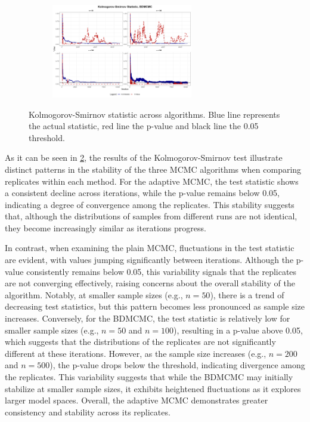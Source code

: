 \documentclass{report}
\begin{document}
\begin{figure}[!ht]
{\begin{minipage}{\textwidth}
			\vspace{0.4cm}   %
			
			\begin{subfigure}[b]{0.45\textwidth}   
				\centering
				\includegraphics[height=4.1cm]{Figures/Diagnostic/KS_BD.png}
				\label{fig:ks-bd}
			\end{subfigure}
		\end{minipage}
	}
	\caption{Kolmogorov-Smirnov statistic across algorithms. Blue line represents the actual statistic, red line the p-value and black line the 0.05 threshold.}
	\label{fig:ks-together}
\end{figure}

As it can be seen in \ref{fig:ks-together}, the results of the Kolmogorov-Smirnov test illustrate distinct patterns in the stability of the three MCMC algorithms when comparing replicates within each method. For the adaptive MCMC, the test statistic shows a consistent decline across iterations, while the p-value remains below 0.05, indicating a degree of convergence among the replicates. This stability suggests that, although the distributions of samples from different runs are not identical, they become increasingly similar as iterations progress. 

In contrast, when examining the plain MCMC, fluctuations in the test statistic are evident, with values jumping significantly between iterations. Although the p-value consistently remains below 0.05, this variability signals that the replicates are not converging effectively, raising concerns about the overall stability of the algorithm. Notably, at smaller sample sizes (e.g., $n=50$), there is a trend of decreasing test statistics, but this pattern becomes less pronounced as sample size increases. 
Conversely, for the BDMCMC, the test statistic is relatively low for smaller sample sizes (e.g., $n=50$ and $n=100$), resulting in a p-value above 0.05, which suggests that the distributions of the replicates are not significantly different at these iterations. However, as the sample size increases (e.g., $n=200$ and $n=500$), the p-value drops below the threshold, indicating divergence among the replicates. This variability suggests that while the BDMCMC may initially stabilize at smaller sample sizes, it exhibits heightened fluctuations as it explores larger model spaces. Overall, the adaptive MCMC demonstrates greater consistency and stability across its replicates.
\end{document}
